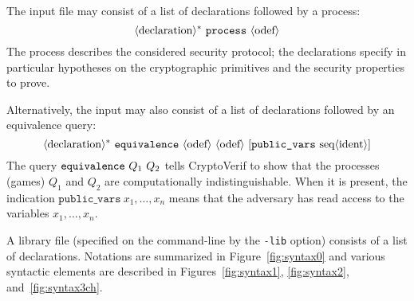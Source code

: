 The input file may consist of a list of declarations followed by  
a process:
\[\langle\textrm{declaration}\rangle^*\ {\tt process}\ \langle\textrm{odef}\rangle\]
The process
describes the considered security 
protocol; the declarations specify in particular hypotheses on the 
cryptographic primitives and the security properties to prove.

Alternatively, the input may also consist of a list of declarations followed
by an equivalence query:
\[\nonterm{declaration}^*\ {\tt equivalence}\ \iprocess\ \iprocess\ [\texttt{public\_vars}\ \seq{ident}]\]
The query ${\tt equivalence}\ Q_1\ Q_2$ tells CryptoVerif to show that
the processes (games) $Q_1$ and $Q_2$ are computationally indistinguishable.
When it is present, the indication $\texttt{public\_vars}\ x_1, \dots, x_n$
means that the adversary has read access to the variables $x_1, \dots, x_n$.

A library file (specified on the command-line by the
{\tt -lib} option) consists of a list of declarations.
Notations are summarized in Figure~\ref{fig:syntax0}
and various syntactic elements are described in 
Figures~\ref{fig:syntax1}, \ref{fig:syntax2}, and~\ref{fig:syntax3ch}.

